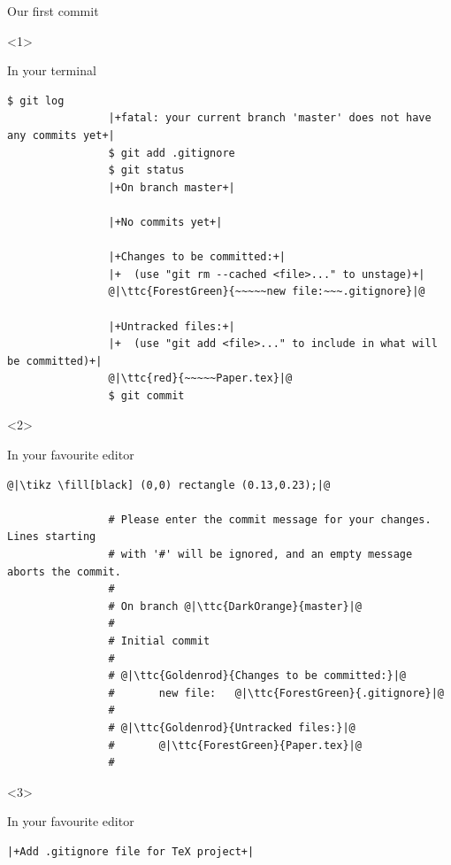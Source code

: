 \documentclass[usenames,svgnames,14pt]{beamer}
\newcommand{\ttc}[2]{\texttt{\textcolor{#1}{#2}}}
\begin{document}
\begin{frame}[fragile]{Our first commit}
    \vspace{-0.09\textheight}
    \begin{overlayarea}{\textwidth}{0.7\textheight}
        \begin{onlyenv}<1>
            \centerline{In your terminal}
            \begin{lstlisting}[style=MyBash, aboveskip=2mm, xleftmargin=-1mm, xrightmargin=-1mm]
                $ git log
                |+fatal: your current branch 'master' does not have any commits yet+|
                $ git add .gitignore
                $ git status
                |+On branch master+|
        
                |+No commits yet+|
        
                |+Changes to be committed:+|
                |+  (use "git rm --cached <file>..." to unstage)+|
                @|\ttc{ForestGreen}{~~~~~new file:~~~.gitignore}|@
        
                |+Untracked files:+|
                |+  (use "git add <file>..." to include in what will be committed)+|
                @|\ttc{red}{~~~~~Paper.tex}|@
                $ git commit
            \end{lstlisting}
        \end{onlyenv}
        \begin{onlyenv}<2>
            \centerline{In your favourite editor}
            \begin{lstlisting}[style=MyBash, aboveskip=2mm, xleftmargin=-3mm, xrightmargin=-3mm]
                @|\tikz \fill[black] (0,0) rectangle (0.13,0.23);|@
    
                # Please enter the commit message for your changes. Lines starting
                # with '#' will be ignored, and an empty message aborts the commit.
                #
                # On branch @|\ttc{DarkOrange}{master}|@
                #
                # Initial commit
                #
                # @|\ttc{Goldenrod}{Changes to be committed:}|@
                #       new file:   @|\ttc{ForestGreen}{.gitignore}|@
                #
                # @|\ttc{Goldenrod}{Untracked files:}|@
                #       @|\ttc{ForestGreen}{Paper.tex}|@
                #
            \end{lstlisting}
        \end{onlyenv}
        \begin{onlyenv}<3>
            \centerline{In your favourite editor}
            \begin{lstlisting}[style=MyBash, aboveskip=2mm, xleftmargin=-3mm, xrightmargin=-3mm]
                |+Add .gitignore file for TeX project+|
    

\end{lstlisting}
\end{onlyenv}
\end{overlayarea}
\end{frame}
\end{document}
